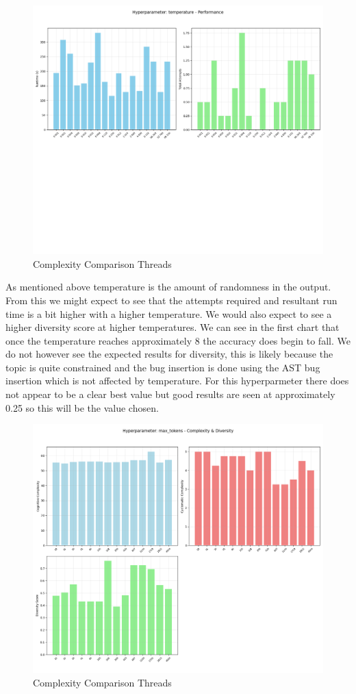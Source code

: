 \documentclass[12pt]{extarticle}
\begin{document}
\begin{figure}[H]
\centering
\includegraphics[width=0.7\linewidth]{Images/Hyperparam_temperature_Performance.png}
\caption{Complexity Comparison Threads}
\label{fig:Complexity_Comparison_Threads}
\end{figure}

As mentioned above temperature is the amount of randomness in the output. From this we might expect to see that the attempts required and resultant run time is a bit higher with a higher temperature. We would also expect to see a higher diversity score at higher temperatures. We can see in the first chart that once the temperature reaches approximately 8 the accuracy does begin to fall. We do not however see the expected results for diversity, this is likely because the topic is quite constrained and the bug insertion is done using the AST bug insertion which is not affected by temperature. For this hyperparmeter there does not appear to be a clear best value but good results are seen at approximately 0.25 so this will be the value chosen.

\begin{figure}[H]
\centering
\includegraphics[width=0.7\linewidth]{Images/Hyperparam_max_tokens_Complexity.png}
\caption{Complexity Comparison Threads}
\label{fig:Complexity_Comparison_Threads}
\end{figure}
\end{document}
